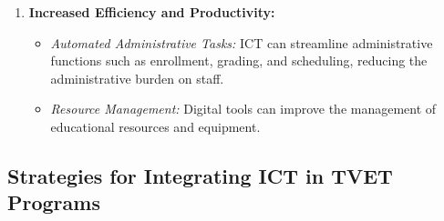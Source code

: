 \documentclass[10pt]{article}
\begin{document}
\begin{enumerate}
\begin{itemize}
        \item \textit{Practical Skills:} Tools such as virtual simulations and software applications allow students to practice technical skills in a controlled environment.
    \end{itemize}
    \item \textbf{Increased Efficiency and Productivity:}
    \begin{itemize}
        \item \textit{Automated Administrative Tasks:} ICT can streamline administrative functions such as enrollment, grading, and scheduling, reducing the administrative burden on staff.
        \item \textit{Resource Management:} Digital tools can improve the management of educational resources and equipment.
    \end{itemize}
\end{enumerate}

\subsection*{Strategies for Integrating ICT in TVET Programs}
\end{document}
